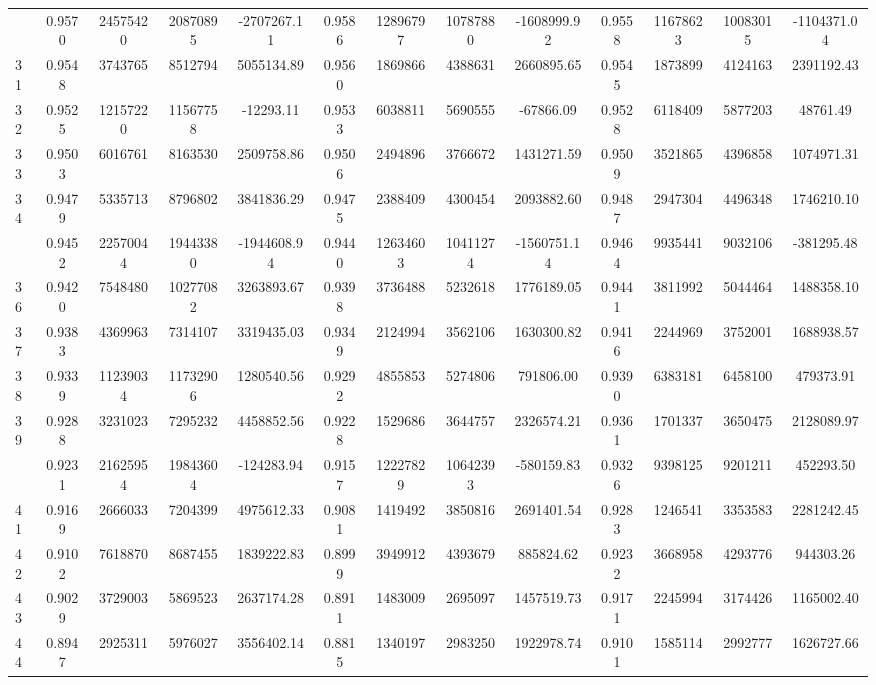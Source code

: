\documentclass[
  12pt,
]{article}
\begin{document}
\begin{longtable}[t]{lcccccccccccc}
\addlinespace
30 & 0.9570 & 24575420 & 20870895 & -2707267.11 & 0.9586 & 12896797 & 10787880 & -1608999.92 & 0.9558 & 11678623 & 10083015 & -1104371.04\\
31 & 0.9548 & 3743765 & 8512794 & 5055134.89 & 0.9560 & 1869866 & 4388631 & 2660895.65 & 0.9545 & 1873899 & 4124163 & 2391192.43\\
32 & 0.9525 & 12157220 & 11567758 & -12293.11 & 0.9533 & 6038811 & 5690555 & -67866.09 & 0.9528 & 6118409 & 5877203 & 48761.49\\
33 & 0.9503 & 6016761 & 8163530 & 2509758.86 & 0.9506 & 2494896 & 3766672 & 1431271.59 & 0.9509 & 3521865 & 4396858 & 1074971.31\\
34 & 0.9479 & 5335713 & 8796802 & 3841836.29 & 0.9475 & 2388409 & 4300454 & 2093882.60 & 0.9487 & 2947304 & 4496348 & 1746210.10\\
\addlinespace
35 & 0.9452 & 22570044 & 19443380 & -1944608.94 & 0.9440 & 12634603 & 10411274 & -1560751.14 & 0.9464 & 9935441 & 9032106 & -381295.48\\
36 & 0.9420 & 7548480 & 10277082 & 3263893.67 & 0.9398 & 3736488 & 5232618 & 1776189.05 & 0.9441 & 3811992 & 5044464 & 1488358.10\\
37 & 0.9383 & 4369963 & 7314107 & 3319435.03 & 0.9349 & 2124994 & 3562106 & 1630300.82 & 0.9416 & 2244969 & 3752001 & 1688938.57\\
38 & 0.9339 & 11239034 & 11732906 & 1280540.56 & 0.9292 & 4855853 & 5274806 & 791806.00 & 0.9390 & 6383181 & 6458100 & 479373.91\\
39 & 0.9288 & 3231023 & 7295232 & 4458852.56 & 0.9228 & 1529686 & 3644757 & 2326574.21 & 0.9361 & 1701337 & 3650475 & 2128089.97\\
\addlinespace
40 & 0.9231 & 21625954 & 19843604 & -124283.94 & 0.9157 & 12227829 & 10642393 & -580159.83 & 0.9326 & 9398125 & 9201211 & 452293.50\\
41 & 0.9169 & 2666033 & 7204399 & 4975612.33 & 0.9081 & 1419492 & 3850816 & 2691401.54 & 0.9283 & 1246541 & 3353583 & 2281242.45\\
42 & 0.9102 & 7618870 & 8687455 & 1839222.83 & 0.8999 & 3949912 & 4393679 & 885824.62 & 0.9232 & 3668958 & 4293776 & 944303.26\\
43 & 0.9029 & 3729003 & 5869523 & 2637174.28 & 0.8911 & 1483009 & 2695097 & 1457519.73 & 0.9171 & 2245994 & 3174426 & 1165002.40\\
44 & 0.8947 & 2925311 & 5976027 & 3556402.14 & 0.8815 & 1340197 & 2983250 & 1922978.74 & 0.9101 & 1585114 & 2992777 & 1626727.66\\

\end{longtable}
\end{document}
